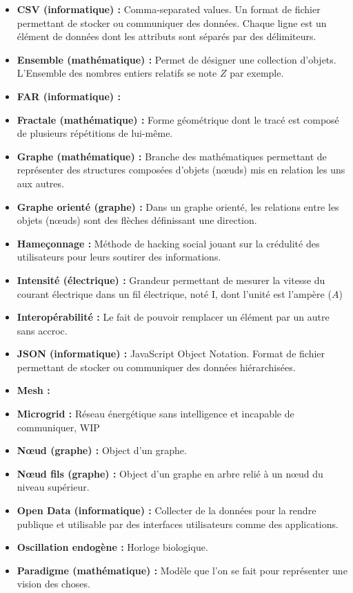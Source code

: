 \begin{itemize}
    \item \textbf{CSV (informatique) :} Comma-separated values. Un format de fichier permettant de stocker ou communiquer des données.
Chaque ligne est un élément de données dont les attributs sont séparés par des délimiteurs.
    \item \textbf{Ensemble (mathématique) :} Permet de désigner une collection d'objets. L'Ensemble des nombres entiers relatifs se note $Z$ par exemple.
    \item \textbf{FAR (informatique) :}
    \item \textbf{Fractale (mathématique) :} Forme géométrique dont le tracé est composé de plusieurs répétitions de lui-même.
    \item \textbf{Graphe (mathématique) :} Branche des mathématiques permettant de représenter des structures composées d'objets (nœuds) mis en relation les uns aux autres.
    \item \textbf{Graphe orienté (graphe) :} Dans un graphe orienté, les relations entre les objets (nœuds) sont des flèches définissant une direction.
    \item \textbf{Hameçonnage :} Méthode de hacking social jouant sur la crédulité des utilisateurs pour leurs soutirer des informations.
    \item \textbf{Intensité (électrique) :} Grandeur permettant de mesurer la vitesse du courant électrique dans un fil électrique, noté I, dont l'unité est l'ampère ($A$)
    \item \textbf{Interopérabilité :} Le fait de pouvoir remplacer un élément par un autre sans accroc.
    \item \textbf{JSON (informatique) :} JavaScript Object Notation. Format de fichier permettant de stocker ou communiquer des données hiérarchisées.
    \item \textbf{Mesh :}
    \item \textbf{Microgrid :} Réseau énergétique sans intelligence et incapable de communiquer, WIP
    \item \textbf{Nœud (graphe) :} Object d'un graphe.
    \item \textbf{Nœud fils (graphe) :} Object d'un graphe en arbre relié à un nœud du niveau supérieur.
    \item \textbf{Open Data (informatique) :} Collecter de la données pour la rendre publique et utilisable par des interfaces utilisateurs comme des applications.
    \item \textbf{Oscillation endogène :} Horloge biologique.
    \item \textbf{Paradigme (mathématique) :} Modèle que l'on se fait pour représenter une vision des choses.

\end{itemize}
